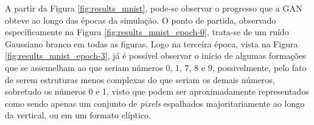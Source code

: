 A partir da Figura \ref{fig:results_mnist}, pode-se observar o progresso que a GAN obteve ao longo das épocas da simulação. O ponto de partida, observado específicamente na Figura \ref{fig:results_mnist_epoch-0}, trata-se de um ruído Gaussiano branco em todas as figuras. Logo na terceira época, vista na Figura \ref{fig:results_mnist_epoch-3}, já é possível observar o início de algumas formações que se assemelham ao que seriam números 0, 1, 7, 8 e 9, possivelmente, pelo fato de serem estruturas menos complexas do que seriam os demais números, sobretudo os números 0 e 1, visto que podem ser aproximadamente representados como sendo apenas um conjunto de \textit{pixels} espalhados majoritariamente ao longo da vertical, ou em um formato elíptico.


\begin{figure}[H]
    \centering
    \hspace{0.5cm}
    \\
    \vspace{0.5cm}
\end{figure}
